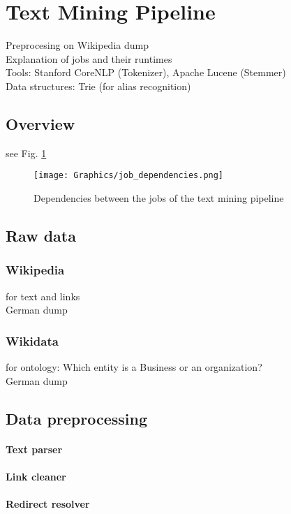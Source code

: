 \section{Text Mining Pipeline}
Preprocesing on Wikipedia dump\\
Explanation of jobs and their runtimes\\
Tools: Stanford CoreNLP (Tokenizer), Apache Lucene (Stemmer)\\
Data structures: Trie (for alias recognition)\\

\subsection{Overview}
see Fig. \ref{fig:job_dependencies}
\begin{figure}[ht]
	\centering
  \texttt{[image: Graphics/job\_dependencies.png]}
	\caption{Dependencies between the jobs of the text mining pipeline}
	\label{fig:job_dependencies}
\end{figure}

\subsection{Raw data}
\subsubsection{Wikipedia}
for text and links\\
German dump

\subsubsection{Wikidata}
for ontology: Which entity is a Business or an organization?\\
German dump

\subsection{Data preprocessing}

\paragraph{Text parser}
\paragraph{Link cleaner}
\paragraph{Redirect resolver}
